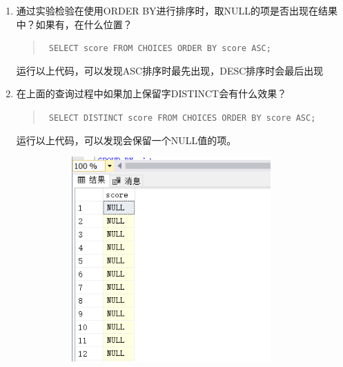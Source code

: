 \documentclass[a4paper,twoside]{article}
\begin{document}
\begin{spacing}{1.2}
\begin{enumerate}
\item 通过实验检验在使用ORDER BY进行排序时，取NULL的项是否出现在结果中？如果有，在什么位置？
\begin{quote}
\texttt{
SELECT score FROM CHOICES ORDER BY score ASC;
}
\end{quote}

运行以上代码，可以发现ASC排序时最先出现，DESC排序时会最后出现

\item 在上面的查询过程中如果加上保留字DISTINCT会有什么效果？
\begin{quote}
\texttt{
SELECT DISTINCT score FROM CHOICES ORDER BY  score ASC;
}
\end{quote}

运行以上代码，可以发现会保留一个NULL值的项。

\begin{figure}[h]
\centering
\caption{运行结果}
\begin{subfigure}{0.3\textwidth}
  \includegraphics[width=0.9\textwidth]{fig30.png}
\end{subfigure}
\begin{subfigure}{0.3\textwidth}

\end{subfigure}
\end{figure}
\end{enumerate}
\end{spacing}
\end{document}
